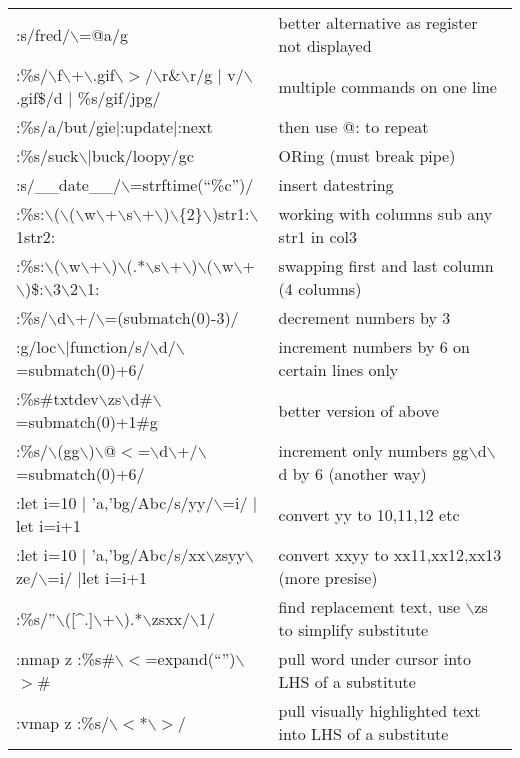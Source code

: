 \begin{center}
\begin{longtable}{l|l}
 :s/fred/$\backslash$=@a/g & better alternative as register not displayed\\
 :\%s/$\backslash$f$\backslash$+$\backslash$.gif$\backslash$$>$/$\backslash$r\&$\backslash$r/g $|$ v/$\backslash$.gif\$/d $|$ \%s/gif/jpg/ & multiple commands on one line\\
 :\%s/a/but/gie$|$:update$|$:next & then use @: to repeat\\
 :\%s/suck$\backslash$$|$buck/loopy/gc & ORing (must break pipe)\\
 :s/\_\_date\_\_/$\backslash$=strftime(``\%c'')/ & insert datestring\\
 :\%s:$\backslash$($\backslash$($\backslash$w$\backslash$+$\backslash$s$\backslash$+$\backslash$)$\backslash$\{2\}$\backslash$)str1:$\backslash$1str2: & working with columns sub any str1 in col3\\
 :\%s:$\backslash$($\backslash$w$\backslash$+$\backslash$)$\backslash$(.*$\backslash$s$\backslash$+$\backslash$)$\backslash$($\backslash$w$\backslash$+$\backslash$)\$:$\backslash$3$\backslash$2$\backslash$1: & swapping first and last column (4 columns)\\
 :\%s/$\backslash$d$\backslash$+/$\backslash$=(submatch(0)-3)/ & decrement numbers by 3\\
 :g/loc$\backslash$$|$function/s/$\backslash$d/$\backslash$=submatch(0)+6/ & increment numbers by 6 on certain lines only\\
 :\%s\#txtdev$\backslash$zs$\backslash$d\#$\backslash$=submatch(0)+1\#g & better version of above\\
 :\%s/$\backslash$(gg$\backslash$)$\backslash$@$<$=$\backslash$d$\backslash$+/$\backslash$=submatch(0)+6/ & increment only numbers gg$\backslash$d$\backslash$d by 6 (another way)\\
 :let i=10 $|$ 'a,'bg/Abc/s/yy/$\backslash$=i/ $|$let i=i+1 & convert yy to 10,11,12 etc\\
 :let i=10 $|$ 'a,'bg/Abc/s/xx$\backslash$zsyy$\backslash$ze/$\backslash$=i/ $|$let i=i+1 & convert xxyy to xx11,xx12,xx13 (more presise) \\
 :\%s/''$\backslash$([\^{}.]$\backslash$+$\backslash$).*$\backslash$zsxx/$\backslash$1/ & find replacement text, use $\backslash$zs to simplify substitute\\
 :nmap z :\%s\#$\backslash$$<$=expand(``'')$\backslash$$>$\# & pull word under cursor into LHS of a substitute\\
 :vmap z :\%s/$\backslash$$<$*$\backslash$$>$/ & pull visually highlighted text into LHS of a substitute
\end{longtable}
\end{center}

